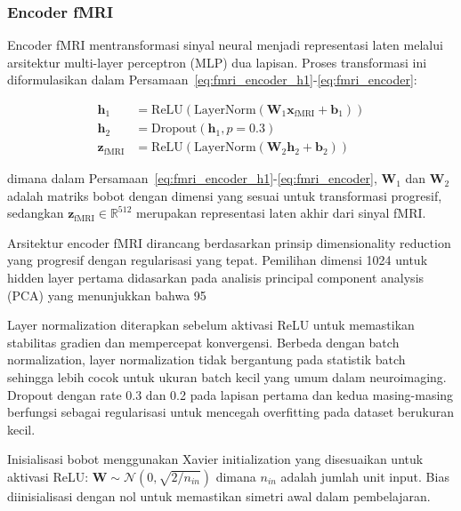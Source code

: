 \subsubsection{Encoder fMRI}
Encoder fMRI mentransformasi sinyal neural menjadi representasi laten melalui arsitektur multi-layer perceptron (MLP) dua lapisan. Proses transformasi ini diformulasikan dalam Persamaan~\ref{eq:fmri_encoder_h1}-\ref{eq:fmri_encoder}:

\begin{align}
\mathbf{h}_1 &= \text{ReLU}(\text{LayerNorm}(\mathbf{W}_1 \mathbf{x}_{\text{fMRI}} + \mathbf{b}_1)) \label{eq:fmri_encoder_h1} \\
\mathbf{h}_2 &= \text{Dropout}(\mathbf{h}_1, p=0.3) \label{eq:fmri_encoder_h2} \\
\mathbf{z}_{\text{fMRI}} &= \text{ReLU}(\text{LayerNorm}(\mathbf{W}_2 \mathbf{h}_2 + \mathbf{b}_2)) \label{eq:fmri_encoder}
\end{align}

dimana dalam Persamaan~\ref{eq:fmri_encoder_h1}-\ref{eq:fmri_encoder}, $\mathbf{W}_1$ dan $\mathbf{W}_2$ adalah matriks bobot dengan dimensi yang sesuai untuk transformasi progresif, sedangkan $\mathbf{z}_{\text{fMRI}} \in \mathbb{R}^{512}$ merupakan representasi laten akhir dari sinyal fMRI.

Arsitektur encoder fMRI dirancang berdasarkan prinsip dimensionality reduction yang progresif dengan regularisasi yang tepat. Pemilihan dimensi 1024 untuk hidden layer pertama didasarkan pada analisis principal component analysis (PCA) yang menunjukkan bahwa 95%

Layer normalization diterapkan sebelum aktivasi ReLU untuk memastikan stabilitas gradien dan mempercepat konvergensi. Berbeda dengan batch normalization, layer normalization tidak bergantung pada statistik batch sehingga lebih cocok untuk ukuran batch kecil yang umum dalam neuroimaging. Dropout dengan rate 0.3 dan 0.2 pada lapisan pertama dan kedua masing-masing berfungsi sebagai regularisasi untuk mencegah overfitting pada dataset berukuran kecil.

Inisialisasi bobot menggunakan Xavier initialization yang disesuaikan untuk aktivasi ReLU: $\mathbf{W} \sim \mathcal{N}(0, \sqrt{2/n_{in}})$ dimana $n_{in}$ adalah jumlah unit input. Bias diinisialisasi dengan nol untuk memastikan simetri awal dalam pembelajaran.


